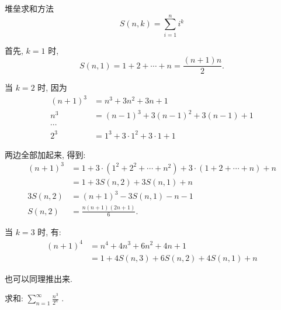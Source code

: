 \newpage

\noindent 堆垒求和方法
\[ S(n,k) = \sum_{i=1}^{n}{i^k} \]

首先, $ k = 1 $ 时, \[ S(n,1) = 1 + 2 + \cdots + n = \frac{(n+1)n}{2} .\]

当 $ k = 2 $ 时, 因为
\begin{align*}
(n+1)^3 &= n^3 + 3n^2 + 3n + 1 \\ 
n^3 &= (n-1)^3 + 3(n-1)^2 + 3(n-1) + 1\\
\cdots & \\
 2^3 &= 1^3 + 3\cdot 1^2 + 3\cdot 1 + 1
\end{align*}

两边全部加起来, 得到: 
\begin{align*} 
(n+1)^3 &= 1 + 3\cdot(1^2+2^2+\cdots+n^2) + 3\cdot(1+2+\cdots+n) + n \\
	&= 1 + 3S(n,2) + 3S(n,1) + n\\
3S(n,2) &= (n+1)^3 - 3S(n,1) - n - 1 \\
	S(n,2) &= \frac{n(n+1)(2n+1)}{6} .
\end{align*}

当 $ k = 3 $ 时, 有:
\begin{align*} 
(n+1)^4 &= n^4 + 4n^3 + 6n^2 + 4n + 1 \\
		&= 1 + 4S(n,3) + 6S(n,2) + 4S(n,1) + n
\end{align*} 

也可以同理推出来.

\newpage
求和: 
$\displaystyle \sum_{n=1}^{\infty}{\frac{n^3}{2^n}}$ .

